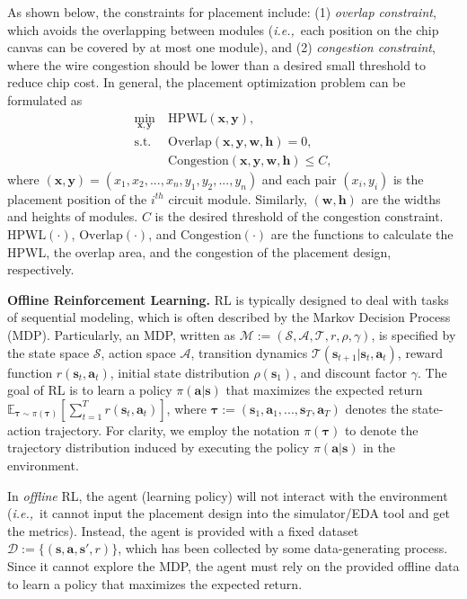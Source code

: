 \documentclass{article}
\newcommand{\ie}{\textit{i.e.,}~}
\newcommand{\bs}{\bm{s}}
\newcommand{\ba}{\bm{a}}
\newcommand{\btau}{\bm{\tau}}
\theoremstyle{plain}
\theoremstyle{definition}
\theoremstyle{remark}
\begin{document}
As shown below, the  constraints for placement include: (1) \textit{overlap constraint}, which avoids the overlapping between modules (\ie each position on the chip canvas can be covered by at most one module), and (2) \textit{congestion constraint}, where the wire congestion should be lower than a desired small threshold to reduce chip cost. 
In general, the placement optimization problem can be formulated as
\begin{align}
\min_{\bm{x}, \bm{y}}&\  \text{HPWL}(\bm{x}, \bm{y}),\\ 
\text{s.t.}&\ \text{Overlap}(\bm{x}, \bm{y}, \bm{w}, \bm{h})=0,\\ 
\quad\ &\ \text{Congestion}(\bm{x}, \bm{y}, \bm{w}, \bm{h})\leq C,
\label{e1}
\end{align}
where $(\bm{x}, \bm{y}) = (x_1, x_2, ..., x_n, y_1, y_2, ..., y_n)$ and each pair $(x_i, y_i)$ is the placement position of the $i^{th}$ circuit module.  Similarly, $(\bm{w}, \bm{h})$ are the widths and heights of modules. $C$ is the desired threshold of the congestion constraint. $\text{HPWL}(\cdot)$, $\text{Overlap}(\cdot)$, and $\text{Congestion}(\cdot)$ are the functions to calculate the HPWL, the overlap area, and the congestion of the placement design, respectively. 

\textbf{Offline Reinforcement Learning.} 
RL is typically designed to deal with tasks of sequential modeling, which is often described by the Markov Decision Process (MDP). Particularly, an MDP, written as $\mathcal{M}:=(\mathcal{S}, \mathcal{A}, \mathcal{T}, {r}, \rho, \gamma)$, is specified by the state space $\mathcal{S}$, action space $\mathcal{A}$, transition dynamics $\mathcal{T}(\bs_{t+1}|\bs_t,\ba_t)$, reward function $r(\bs_t,\ba_t)$, initial
state distribution $\rho(\bs_1)$, and discount factor $\gamma$. The goal of RL is to learn a policy $\pi(\ba|\bs)$ that maximizes the expected return $\mathbb{E}_{\btau\sim \pi(\btau)}[\sum_{t=1}^Tr(\bs_t, \ba_t)]$, where $\btau:=(\bm{s}_1, \bm{a}_1, ..., \bm{s}_T, \bm{a}_T)$ denotes the state-action trajectory. 
For clarity, we employ the notation $\pi(\btau)$ to denote the trajectory distribution induced by executing the policy $\pi(\ba|\bs)$ in the environment. 

In \textit{offline} RL, the agent (learning policy) will not interact with the environment (\ie it cannot input the placement design into the simulator/EDA tool and get the metrics). Instead, the agent is provided with a fixed dataset $\mathcal{D}:=\{(\bs, \ba, \bs', r)\}$, which has been collected by some data-generating process. Since it cannot explore the MDP, the agent must rely on the provided offline data to learn a policy that maximizes the expected return.
\end{document}
